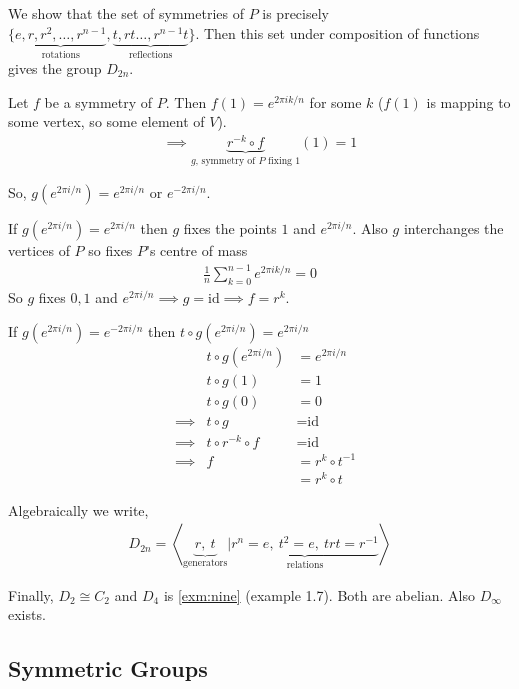 We show that the set of symmetries of \(P\) is precisely \(\{\underbrace{e, r, r^2, \ldots, r^{n-1}}_\text{rotations}, \underbrace{t, rt \ldots, r^{n-1}t}_\text{reflections} \}\).
Then this set under composition of functions gives the group \(D_{2n}\).

Let \(f\) be a symmetry of \(P\). Then \(f(1) = e^{2 \pi i k /n}\) for some \(k\) (\(f(1)\) is mapping to some vertex, so some element of \(V\)).
\begin{align*}
    \implies \underbrace{r^{-k} \circ f}_\text{$g$, symmetry of $P$ fixing $1$}(1) = 1
\end{align*}

So, \(g(e^{2 \pi i /n}) = e^{2 \pi i /n}\) or \(e^{-2 \pi i /n}\).

If \(g(e^{2 \pi i /n}) = e^{2 \pi i /n}\) then \(g\) fixes the points \(1\) and \(e^{2 \pi i / n}\).
Also \(g\) interchanges the vertices of \(P\) so fixes \(P\)'s centre of mass
\begin{align*}
    \frac{1}{n} \sum_{k=0}^{n-1} e^{2 \pi i k /n} = 0
\end{align*}
So \(g\) fixes \(0, 1\) and \(e^{2 \pi i / n} \implies g = \text{id} \implies f = r^{k}\).

If \(g(e^{2 \pi i /n}) = e^{-2 \pi i /n}\) then \(t \circ g(e^{2 \pi i / n}) = e^{2 \pi i / n}\)
\begin{align*}
    && t \circ g(e^{2 \pi i / n}) &= e^{2 \pi i / n} \\
    && t \circ g (1) &= 1 \\
    && t \circ g (0) &= 0 \\
    &\implies & t \circ g &= \text{id} \\
    &\implies & t \circ r^{-k} \circ f &= \text{id} \\
    &\implies & f &= r^{k} \circ t^{-1} \\
    && &= r^k \circ t
\end{align*}

Algebraically we write,
\begin{align*}
    D_{2n} = \left\langle \underbrace{r,\ t}_\text{generators} | \underbrace{r^n = e,\ t^2 = e,\ trt = r^{-1}}_\text{relations} \right\rangle 
\end{align*}

Finally, \(D_2 \cong C_2\) and \(D_4\) is \ref{exm:nine} (example 1.7).
Both are abelian.
Also \(D_\infty\) exists.

\hypertarget{symmetric-groups}{%
\subsection{Symmetric Groups}\label{symmetric-groups}}


